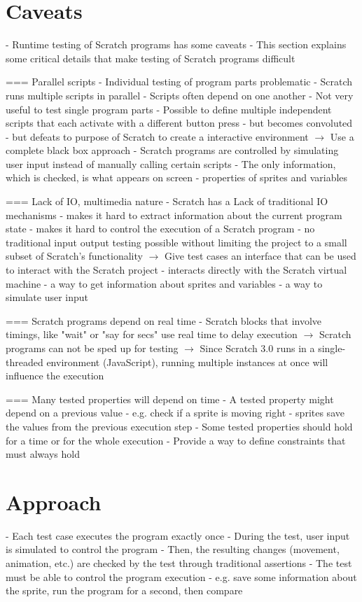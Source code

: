 \section{Caveats}
- Runtime testing of Scratch programs has some caveats
- This section explains some critical details that make testing of Scratch programs difficult

=== Parallel scripts
- Individual testing of program parts problematic
    - Scratch runs multiple scripts in parallel
        - Scripts often depend on one another
    - Not very useful to test single program parts
    - Possible to define multiple independent scripts that each activate with a different button press
        - but becomes convoluted
        - but defeats to purpose of Scratch to create a interactive environment
$\rightarrow$ Use a complete black box approach
    - Scratch programs are controlled by simulating user input instead of manually calling certain scripts
    - The only information, which is checked, is what appears on screen
        - properties of sprites and variables

=== Lack of IO, multimedia nature
- Scratch has a Lack of traditional IO mechanisms
    - makes it hard to extract information about the current program state
    - makes it hard to control the execution of a Scratch program
    - no traditional input output testing possible without limiting the project to a small subset of Scratch's functionality
$\rightarrow$ Give test cases an interface that can be used to interact with the Scratch project
    - interacts directly with the Scratch virtual machine
    - a way to get information about sprites and variables
    - a way to simulate user input

=== Scratch programs depend on real time
- Scratch blocks that involve timings, like "wait" or "say for secs" use real time to delay execution
$\rightarrow$ Scratch programs can not be sped up for testing
$\rightarrow$ Since Scratch 3.0 runs in a single-threaded environment (JavaScript), running multiple instances
              at once will influence the execution

=== Many tested properties will depend on time
- A tested property might depend on a previous value
    - e.g. check if a sprite is moving right
    - sprites save the values from the previous execution step
- Some tested properties should hold for a time or for the whole execution
    - Provide a way to define constraints that must always hold

\section{Approach}
- Each test case executes the program exactly once
- During the test, user input is simulated to control the program
- Then, the resulting changes (movement, animation, etc.) are checked by the test through traditional assertions
- The test must be able to control the program execution
    - e.g. save some information about the sprite, run the program for a second, then compare

